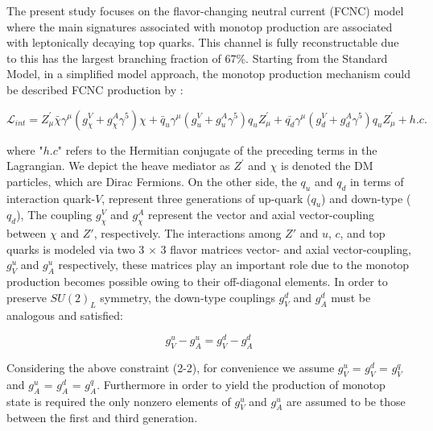 The present study focuses on the flavor-changing neutral current (FCNC) model where the main signatures associated with monotop production are associated with leptonically decaying top quarks. This channel is fully reconstructable due to this has the largest branching fraction of 67\%. Starting from the Standard Model, in a simplified model approach, the monotop production mechanism could be described FCNC production by \cite{319,320,322}: 


\begin{equation}
\mathcal{L}_{int} = Z^{'}_{\mu }\bar{\chi}\gamma^{\mu}(g^{V}_{\chi}+g^{A}_{\chi}\gamma ^{5})\chi + \bar{q}_{u}\gamma^{\mu}(g^{V}_{u}+g^{A}_{u}\gamma^{5})q_{u}Z^{'}_{\mu}+\bar{q_{d}}\gamma^{\mu}(g^{V}_{d}+g^{A}_{d}\gamma ^{5})q_{u}Z^{'}_{\mu} + h.c.
\end{equation}

\noindent where "$h.c$"  refers to the Hermitian conjugate of the preceding terms in the Lagrangian. We depict the heave mediator as $Z^{'}$ and $\chi$ is denoted the DM particles, which are Dirac Fermions. On the other side, the $q_{u}$ and $q_{d}$ in terms of interaction quark-$V$, represent three generations of up-quark ($q_{u}$) and down-type ($q_{d}$),  The coupling $g_{\chi}^{V}$ and $g_{\chi}^{A}$ represent the vector and axial vector-coupling between $\chi$ and $Z'$, respectively. The interactions among $Z'$ and $u$, $c$, and top quarks is modeled via two 3 $\times$ 3 flavor matrices vector- and axial vector-coupling, $g_{V}^{u}$ and $g_{A}^{u}$ respectively, these matrices play an important role due to the monotop production becomes possible owing to their off-diagonal elements. In order to preserve $SU(2)_{L}$ symmetry, the down-type couplings $g_{V}^{d}$ and $g_{A}^{d}$ must be analogous and satisfied:

\begin{equation}
g_{V}^{u}-g_{A}^{u} = g_{V}^{d} - g_{A}^{d}
\end{equation}

Considering the above constraint (2-2), for convenience we assume $g_{V}^{u}$ = $g_{V}^{d}$ =  $g_{V}^{q}$ and $g_{A}^{u}$ = $g_{A}^{d}$ =  $g_{A}^{q}$. Furthermore in order to yield the production of monotop state is required the only nonzero elements of $g_{V}^{u}$ and $g_{A}^{u}$ are assumed to be those between the first and third generation.

